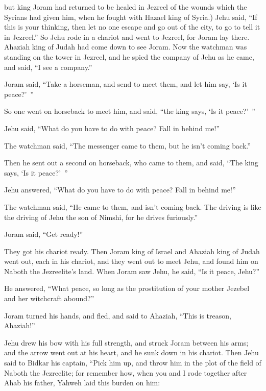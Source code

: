 {but king Joram had returned to be healed in Jezreel of the wounds which the Syrians had given him, when he fought with Hazael king of Syria.) Jehu said, “If this is your thinking, then let no one escape and go out of the city, to go to tell it in Jezreel.”
So Jehu rode in a chariot and went to Jezreel, for Joram lay there. Ahaziah king of Judah had come down to see Joram.
Now the watchman was standing on the tower in Jezreel, and he spied the company of Jehu as he came, and said, “I see a company.”
\par }{\PP Joram said, “Take a horseman, and send to meet them, and let him say, ‘Is it peace?’ ”
\par }{\PP {}So one went on horseback to meet him, and said, “the king says, ‘Is it peace?’ ”
\par }{\PP Jehu said, “What do you have to do with peace? Fall in behind me!”
\par }{\PP The watchman said, “The messenger came to them, but he isn’t coming back.”
\par }{\PP {}Then he sent out a second on horseback, who came to them, and said, “The king says, ‘Is it peace?’ ”
\par }{\PP Jehu answered, “What do you have to do with peace? Fall in behind me!”
\par }{\PP {}The watchman said, “He came to them, and isn’t coming back. The driving is like the driving of Jehu the son of Nimshi, for he drives furiously.”
\par }{\PP {}Joram said, “Get ready!”
\par }{\PP They got his chariot ready. Then Joram king of Israel and Ahaziah king of Judah went out, each in his chariot, and they went out to meet Jehu, and found him on Naboth the Jezreelite’s land.
When Joram saw Jehu, he said, “Is it peace, Jehu?”
\par }{\PP He answered, “What peace, so long as the prostitution of your mother Jezebel and her witchcraft abound?”
\par }{\PP {}Joram turned his hands, and fled, and said to Ahaziah, “This is treason, Ahaziah!”
\par }{\PP {}Jehu drew his bow with his full strength, and struck Joram between his arms; and the arrow went out at his heart, and he sunk down in his chariot.
Then Jehu said to Bidkar his captain, “Pick him up, and throw him in the plot of the field of Naboth the Jezreelite; for remember how, when you and I rode together after Ahab his father, Yahweh laid this burden on him:
}
